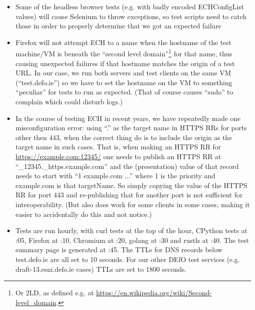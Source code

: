\begin{itemize}

    \item Some of the headless browser tests (e.g. with badly encoded
        ECHConfigList values) will cause Selenium to throw exceptions, so test
        scripts need to catch those in order to properly determine that we got
        an expected failure

    \item Firefox will not attempt ECH to a name when the hostname of the test
        machine/VM is beneath the ``second level domain''\footnote{Or 2LD, as
        defined e.g. at
        \url{https://en.wikipedia.org/wiki/Second-level_domain}.} for that
        name, thus causing unexpected failures if that hostname matches the
        origin of a test URL. In our case, we run both servers and test clients
        on the same VM (``test.defo.ie'') so we have to set the hostname on the
        VM to something ``peculiar'' for tests to run as expected. (That of
        course causes ``sudo'' to complain which could disturb logs.)

    \item In the course of testing ECH in recent years, we have repeatedly made
        one misconfiguration error: using ``.'' as the target name in HTTPS RRs
        for ports other then 443, when the correct thing do is to include the
        origin as the target name in such cases. That is, when making an HTTPS
        RR for \url{https://example.com:12345/} one needs to publish an HTTPS
        RR at ``\_12345.\_https.example.com'' and the (presentation) value of
        that record needs to start with ``1 example.com ...'' where 1 is the
        priority and example.com is that targetName. So simply copying the
        value of the HTTPS RR for port 443 and re-publishing that for another
        port is not sufficient for interoperability. (But also does work for
        some clients in some cases, making it easier to accidentally do this
        and not notice.)

    \item Tests are run hourly, with curl tests at the top of the hour,
        CPython tests at :05, Firefox at :10, Chromium at :20, golang at :30
        and rustls at :40. The test summary page is generated at :45.
        The TTLs for DNS records below test.defo.ie are all set to 10 seconds.
        For our other DEfO test services (e.g. draft-13.esni.defo.ie cases)
        TTLs are set to 1800 seconds.

\end{itemize}

